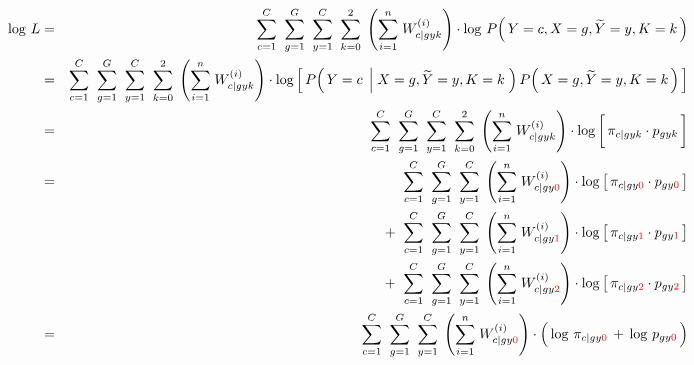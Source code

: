 \vskip 0.3cm
\begin{eqnarray*}
\log\,L &=&
	\overset{C}{\underset{c=1}{\sum}}\;\;
	\overset{G}{\underset{g=1}{\sum}}\;\;
	\overset{C}{\underset{y=1}{\sum}}\;\;
	\overset{2}{\underset{k=0}{\sum}}\;
	\left(\overset{n}{\underset{i=1}{\sum}}\;W^{(i)}_{c \vert gyk}\right)
	\cdot
	\log\,P\!\left(\,Y=c,X=g,\widetilde{Y}=y,K=k\,\right)
\\
&=&
	\overset{C}{\underset{c=1}{\sum}}\;\;
	\overset{G}{\underset{g=1}{\sum}}\;\;
	\overset{C}{\underset{y=1}{\sum}}\;\;
	\overset{2}{\underset{k=0}{\sum}}\;
	\left(\overset{n}{\underset{i=1}{\sum}}\;W^{(i)}_{c \vert gyk}\right)
	\cdot
	\log\left[\,
		P\!\left(\,Y=c\;\left\vert\;X=g,\widetilde{Y}=y,K=k\right.\,\right)
		P\!\left(\,X=g,\widetilde{Y}=y,K=k\,\right)
	\,\right]
\\
&=&
	\overset{C}{\underset{c=1}{\sum}}\;\;
	\overset{G}{\underset{g=1}{\sum}}\;\;
	\overset{C}{\underset{y=1}{\sum}}\;\;
	\overset{2}{\underset{k=0}{\sum}}\;
	\left(\overset{n}{\underset{i=1}{\sum}}\;W^{(i)}_{c \vert gyk}\right)
	\cdot
	\log\left[\,
		\pi_{c \vert gyk} \overset{{\color{white}\vert}}{\cdot} p_{gyk}
	\,\right]
\\
&=&
	{\color{white}+} \;\;
	\overset{C}{\underset{c=1}{\sum}}\;\;
	\overset{G}{\underset{g=1}{\sum}}\;\;
	\overset{C}{\underset{y=1}{\sum}}\;
	\left(\overset{n}{\underset{i=1}{\sum}}\;W^{(i)}_{c \vert gy{\color{red}0}}\right)
	\cdot
	\log\left[\,
		\pi_{c \vert gy\color{red}0} \cdot p_{gy\color{red}0}
	\,\right]
\\
&&
	+ \;\;
	\overset{C}{\underset{c=1}{\sum}}\;\;
	\overset{G}{\underset{g=1}{\sum}}\;\;
	\overset{C}{\underset{y=1}{\sum}}\;
	\left(\overset{n}{\underset{i=1}{\sum}}\;W^{(i)}_{c \vert gy{\color{red}1}}\right)
	\cdot
	\log\left[\,
		\pi_{c \vert gy\color{red}1} \cdot p_{gy\color{red}1}
	\,\right]
\\
&&
	+ \;\;
	\overset{C}{\underset{c=1}{\sum}}\;\;
	\overset{G}{\underset{g=1}{\sum}}\;\;
	\overset{C}{\underset{y=1}{\sum}}\;
	\left(\overset{n}{\underset{i=1}{\sum}}\;W^{(i)}_{c \vert gy{\color{red}2}}\right)
	\cdot
	\log\left[\,
		\pi_{c \vert gy\color{red}2} \cdot p_{gy\color{red}2}
	\,\right]
\\
&=&
	{\color{white}+} \;\;
	\overset{C}{\underset{c=1}{\sum}}\;\;
	\overset{G}{\underset{g=1}{\sum}}\;\;
	\overset{C}{\underset{y=1}{\sum}}\;
	\left(\overset{n}{\underset{i=1}{\sum}}\;W^{(i)}_{c \vert gy{\color{red}0}}\right)
	\cdot
	\left(\,
		\log\,\pi_{c \vert gy\color{red}0} \,\overset{{\color{white}.}}{+}\, \log\,p_{gy\color{red}0}
	\,\right)
\\

\end{eqnarray*}
